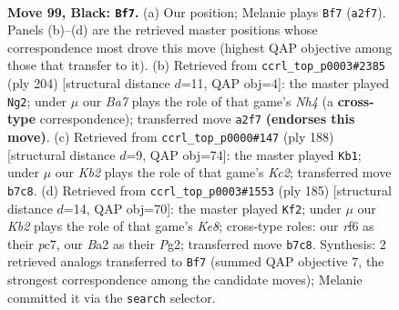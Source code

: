 \documentclass[11pt]{article}
\begin{document}
\clearpage

\begin{figure}[p]\centering
\begin{subfigure}{0.46\textwidth}\centering
\resizebox{\linewidth}{!}{%
\newchessgame
\chessboard[
  setfen={1r6/1k4R1/5R2/8/4K3/8/b7/8 b - - 1 99},
  showmover=false,
  pgfstyle=straightmove, color=movearrow, markmove={a2-f7}
]}
\caption{}
\end{subfigure}\hfill
\begin{subfigure}{0.46\textwidth}\centering
\resizebox{\linewidth}{!}{%
\newchessgame
\chessboard[
  setfen={8/8/8/3k4/2r4N/6RK/r7/8 w - - 76 103},
  showmover=false,
  pgfstyle=straightmove, color=movearrow, markmove={h4-g2}
]}
\caption{}
\end{subfigure}
\\[4pt]
\begin{subfigure}{0.46\textwidth}\centering
\resizebox{\linewidth}{!}{%
\newchessgame
\chessboard[
  setfen={1k6/8/8/8/8/2R5/2K4r/8 w - - 20 95},
  showmover=false,
  pgfstyle=straightmove, color=movearrow, markmove={c2-b1}
]}
\caption{}
\end{subfigure}\hfill
\begin{subfigure}{0.46\textwidth}\centering
\resizebox{\linewidth}{!}{%
\newchessgame
\chessboard[
  setfen={8/2P5/4R3/8/3K4/8/6p1/2r1k3 b - - 16 93},
  showmover=false,
  pgfstyle=straightmove, color=movearrow, markmove={e1-f2}
]}
\caption{}
\end{subfigure}
\caption{\textbf{Move 99, Black: \texttt{Bf7}.} (a) Our position; Melanie plays \texttt{Bf7} (\texttt{a2f7}). Panels (b)--(d) are the retrieved master positions whose correspondence most drove this move (highest QAP objective among those that transfer to it). (b) Retrieved from \texttt{ccrl\_top\_p0003\#2385} (ply 204) [structural distance $d$=11, QAP obj=4]: the master played \texttt{Ng2}; under $\mu$ our \emph{Ba7} plays the role of that game's \emph{Nh4} (a \textbf{cross-type} correspondence); transferred move \texttt{a2f7} \textbf{(endorses this move)}. (c) Retrieved from \texttt{ccrl\_top\_p0000\#147} (ply 188) [structural distance $d$=9, QAP obj=74]: the master played \texttt{Kb1}; under $\mu$ our \emph{Kb2} plays the role of that game's \emph{Kc2}; transferred move \texttt{b7c8}. (d) Retrieved from \texttt{ccrl\_top\_p0003\#1553} (ply 185) [structural distance $d$=14, QAP obj=70]: the master played \texttt{Kf2}; under $\mu$ our \emph{Kb2} plays the role of that game's \emph{Ke8}; cross-type roles: our \emph{r}f6 as their \emph{p}c7, our \emph{B}a2 as their \emph{P}g2; transferred move \texttt{b7c8}. Synthesis: 2 retrieved analogs transferred to \texttt{Bf7} (summed QAP objective 7, the strongest correspondence among the candidate moves); Melanie committed it via the \texttt{search} selector.}
\label{fig:thought-m197}
\end{figure}
\end{document}
